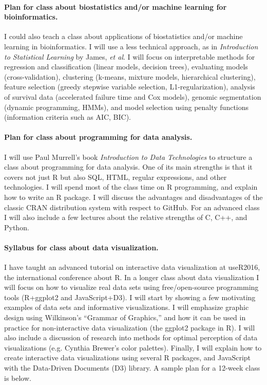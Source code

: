 \documentclass{article}
\begin{document}
\paragraph{Plan for class about biostatistics and/or machine learning for
  bioinformatics.}
I could also teach a class about applications of biostatistics and/or
machine learning in bioinformatics. I will use a less technical
approach, as in \emph{Introduction to Statistical Learning} by James,
\emph{et al}. I will focus on interpretable methods for regression and
classification (linear models, decision trees), evaluating models
(cross-validation), clustering (k-means, mixture models, hierarchical
clustering), feature selection (greedy stepwise variable selection,
L1-regularization), analysis of survival data (accelerated failure
time and Cox models), genomic segmentation (dynamic programming,
HMMs), and model selection using penalty functions (information
criteria such as AIC, BIC).

\paragraph{Plan for class about programming for data analysis.} I will
use Paul Murrell's book \emph{Introduction to Data Technologies} to
structure a class about programming for data analysis. One of its main
strengths is that it covers not just R but also SQL, HTML, regular
expressions, and other technologies. I will spend most of the class
time on R programming, and explain how to write an R package. I will
discuss the advantages and disadvantages of the classic CRAN
distribution system with respect to GitHub. For an advanced class I
will also include a few lectures about the relative strengths of C,
C++, and Python.

\paragraph{Syllabus for class about data visualization.} I have taught
an advanced tutorial on interactive data visualization at useR2016,
the international conference about R. In a longer class about data
visualization I will focus on how to visualize real data sets using
free/open-source programming tools (R+ggplot2 and JavaScript+D3). I
will start by showing a few motivating examples of data sets and
informative visualizations. I will emphasize graphic design using
Wilkinson's ``Grammar of Graphics,'' and how it can be used in
practice for non-interactive data visualization (the ggplot2 package
in R). I will also include a discussion of research into methods for
optimal perception of data visualizations (e.g. Cynthia Brewer's color
palettes). Finally, I will explain how to create interactive data
visualizations using several R packages, and JavaScript with the
Data-Driven Documents (D3) library. A sample plan for a 12-week class
is below.
\end{document}

